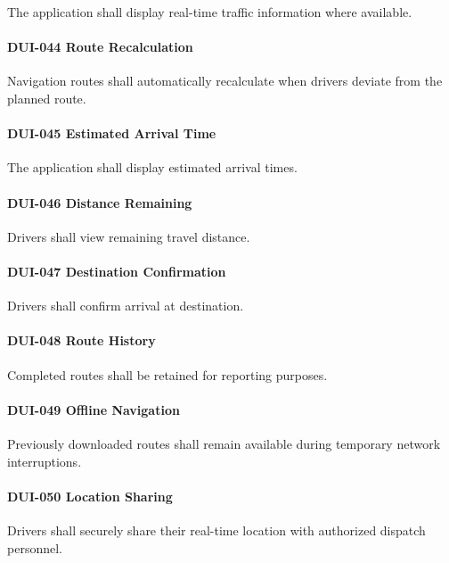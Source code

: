 The application shall display real-time traffic information where
available.

\paragraph{DUI-044 Route Recalculation}

Navigation routes shall automatically recalculate when drivers deviate
from the planned route.

\paragraph{DUI-045 Estimated Arrival Time}

The application shall display estimated arrival times.

\paragraph{DUI-046 Distance Remaining}

Drivers shall view remaining travel distance.

\paragraph{DUI-047 Destination Confirmation}

Drivers shall confirm arrival at destination.

\paragraph{DUI-048 Route History}

Completed routes shall be retained for reporting purposes.

\paragraph{DUI-049 Offline Navigation}

Previously downloaded routes shall remain available during temporary
network interruptions.

\paragraph{DUI-050 Location Sharing}

Drivers shall securely share their real-time location with authorized
dispatch personnel.


